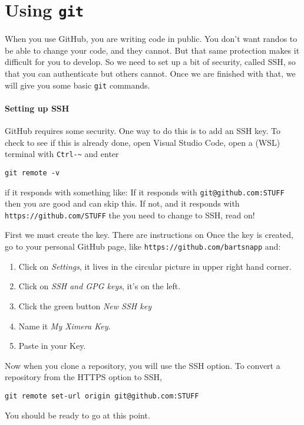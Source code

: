 \documentclass{ximera}
\begin{document}
\section{Using \texttt{git}}

When you use GitHub, you are writing code in public. You don't want randos to
be able to change your code, and they cannot.  But that same protection makes
it difficult for you to develop. So we need to set up a bit of security, called
SSH, so that you can authenticate but others cannot.
Once we are finished with that, we will give you some basic \texttt{git}
commands.

\paragraph{Setting up SSH} GitHub requires some security. One way to do this is
to add an SSH key. To check to see if this is already done, open Visual Studio
Code, open a (WSL) terminal with \verb!Ctrl-~! and enter
\begin{verbatim}
git remote -v
\end{verbatim}
if it responds with something like: If it responds with
\verb!git@github.com:STUFF! then you
are good and can skip this. If not, and it responds with
\verb!https://github.com/STUFF! the you
need to change to SSH, read on!

First we must create the key. There are instructions on 
Once the key is created, go to your personal GitHub page, like
\verb!https://github.com/bartsnapp! and:
\begin{enumerate}
      \item  Click on \textit{Settings}, it lives in the circular picture in
            upper right hand corner.
      \item Click on \textit{SSH and GPG keys}, it's on the left.
      \item Click the green button \textit{New SSH key}
      \item Name it \textit{My Ximera Key}.
      \item Paste in your Key.
\end{enumerate}
Now when you clone a repository, you will use the SSH option.  To convert a
repository from the HTTPS option to SSH,
\begin{verbatim}
git remote set-url origin git@github.com:STUFF
\end{verbatim}
You should be ready to go at this point.
\end{document}
